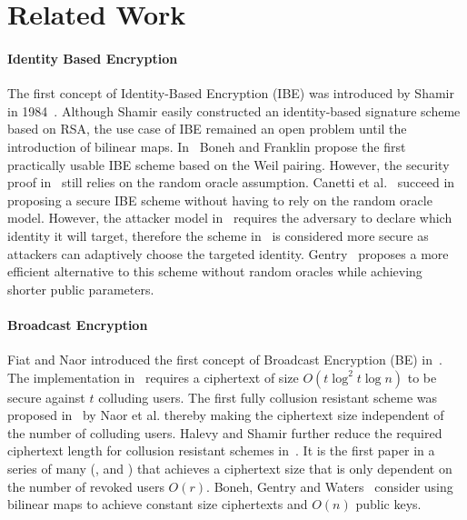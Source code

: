 \documentclass[11pt]{article}
\begin{document}
\section*{Related Work}

\paragraph{Identity Based Encryption} The first concept of Identity-Based Encryption (IBE) was introduced by Shamir in 1984~\cite{DBLP:conf/crypto/Shamir84}. Although Shamir easily constructed an identity-based signature scheme based on RSA, the use case of IBE remained an open problem until the introduction of bilinear maps. In~\cite{BonehFranklinIBE} Boneh and Franklin propose the first practically usable IBE scheme based on the Weil pairing. However, the security proof in~\cite{BonehFranklinIBE} still relies on the random oracle assumption. Canetti et al.~\cite{Canetti} succeed in proposing a secure IBE scheme without having to rely on the random oracle model. However, the attacker model in~\cite{Canetti} requires the adversary to declare which identity it will target, therefore the scheme in~\cite{BonehBoyenRandomOracles} is considered more secure as attackers can adaptively choose the targeted identity. Gentry~\cite{GentryRandomOracles} proposes a more efficient alternative to this scheme without random oracles while achieving shorter public parameters. 

\paragraph{Broadcast Encryption} Fiat and Naor introduced the first concept of Broadcast Encryption (BE) in~\cite{FiatBE}. The implementation in~\cite{FiatBE} requires a ciphertext of size $O \left( t \log^2 t \log n \right)$ to be secure against $t$ colluding users. The first fully collusion resistant scheme was proposed in~\cite{NaorNaor} by Naor et al. thereby making the ciphertext size independent of the number of colluding users. Halevy and Shamir further reduce the required ciphertext length for collusion resistant schemes in~\cite{HalevyS02}. It is the first paper in a series of many (\cite{DodisF02}, \cite{GoodrichST04} and \cite{LewkoSW08}) that achieves a ciphertext size that is only dependent on the number of revoked users $O \left( r \right)$. Boneh, Gentry and Waters~\cite{BonehGW05} consider using bilinear maps to achieve constant size ciphertexts and $O \left( n \right)$ public keys.
\end{document}
